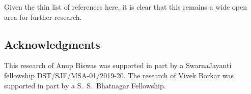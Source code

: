 \documentclass[notitlepage,11pt,reqno]{amsart}
\numberwithin{equation}{section}
\theoremstyle{plain}
\theoremstyle{definition}
\theoremstyle{remark}
\begin{document}
Given the thin list of references here, it is clear that this remains a wide open area for further research.




\subsection*{Acknowledgments}
This research of Anup Biswas was supported in part by a SwarnaJayanti fellowship  DST/SJF/MSA-01/2019-20. The research of Vivek Borkar was supported in part by a S.\ S.\ Bhatnagar Fellowship.

%

\end{document}
